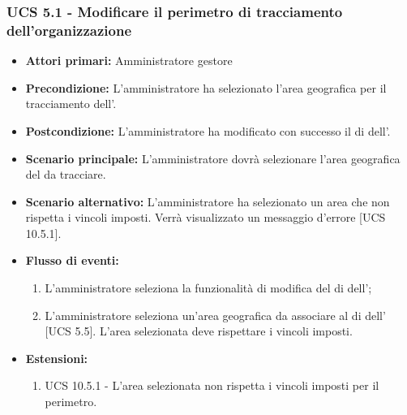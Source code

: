 \subsubsection{UCS 5.1 - Modificare il perimetro di tracciamento dell'organizzazione}%
\begin{itemize}
    \item \textbf{Attori primari:} Amministratore gestore
    \item \textbf{Precondizione:} L'amministratore ha selezionato l’area geografica per il tracciamento dell'.
    \item \textbf{Postcondizione:} L'amministratore ha modificato con successo il  di  dell'.
    \item \textbf{Scenario principale:} L'amministratore dovrà selezionare l'area geografica del  da tracciare.
     \item \textbf{Scenario alternativo:} L'amministratore ha selezionato un area che non rispetta i vincoli imposti. Verrà visualizzato un messaggio d'errore [UCS 10.5.1].
    \item \textbf{Flusso di eventi:}
    \begin{enumerate}%
        \item L'amministratore seleziona la funzionalità di modifica del  di  dell';
        \item L'amministratore seleziona un'area geografica da associare al  di  dell' [UCS 5.5]. L'area selezionata deve rispettare i vincoli imposti.
    \end{enumerate}
    \item \textbf{Estensioni:}
    \begin{enumerate}
        \item UCS 10.5.1 - L'area selezionata non rispetta i vincoli imposti per il perimetro.
    \end{enumerate}
\end{itemize}

